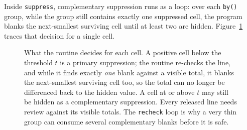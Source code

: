 \documentclass[
    a4paper,
    fontsize=10pt,
    twoside=true,
    numbers=noenddot,
]{kaobook}
\begin{document}
Inside \texttt{suppress}, complementary suppression runs as a loop: over each \texttt{by()} group, while the group still contains exactly one suppressed cell, the program blanks the next-smallest surviving cell until at least two are hidden. Figure~\ref{fig:ch14-viz-suppress} traces that decision for a single cell.

\begin{figure}[htbp]
\centering
{}
\caption[The suppression decision, cell by cell]{What the routine decides for each cell. A positive cell below the threshold $t$ is a primary suppression; the routine re-checks the line, and while it finds exactly \emph{one} blank against a visible total, it blanks the next-smallest surviving cell too, so the total can no longer be differenced back to the hidden value. A cell at or above $t$ may still be hidden as a complementary suppression. Every released line needs review against its visible totals. The \texttt{recheck} loop is why a very thin group can consume several complementary blanks before it is safe.}
\label{fig:ch14-viz-suppress}
\end{figure}
\end{document}
